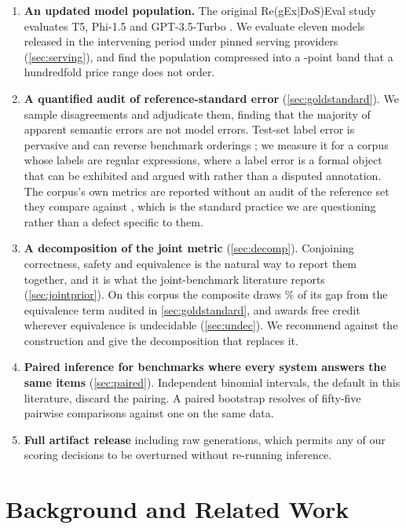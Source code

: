 \documentclass[11pt]{article}
\begin{document}
\begin{enumerate}
  \item \textbf{An updated model population.}
  The original Re(gEx$|$DoS)Eval study evaluates T5, Phi-1.5 and
  GPT-3.5-Turbo \citep{siddiq2024regexeval}. We
  evaluate eleven models released in the intervening period under pinned
  serving providers (\cref{sec:serving}), and find the population compressed
  into a \bandwidth{}-point band that a hundredfold price range does not
  order.

  \item \textbf{A quantified audit of reference-standard error}
  (\cref{sec:goldstandard}). We sample disagreements and adjudicate them,
  finding that the majority of apparent semantic errors are not model errors.
  Test-set label error is pervasive and can reverse benchmark orderings
  \citep{northcutt2021labelerrors}; we measure it for a corpus
  whose labels are regular expressions, where a label error is a formal
  object that can be exhibited and argued with rather than a disputed
  annotation. The corpus's own metrics are reported without an audit of the
  reference set they compare against \citep{siddiq2024regexeval}, which is the standard
  practice we are questioning rather than a defect specific to them.

  \item \textbf{A decomposition of the joint metric} (\cref{sec:decomp}).
  Conjoining correctness, safety and equivalence is the natural way to report
  them together, and it is what the joint-benchmark literature reports
  (\cref{sec:jointprior}). On this corpus the composite draws \equivshare{}\%
  of its gap from the equivalence term audited in \cref{sec:goldstandard}, and awards free
  credit wherever equivalence is undecidable (\cref{sec:undec}). We recommend
  against the construction and give the decomposition that replaces it.

  \item \textbf{Paired inference for benchmarks where every system answers
  the same items} (\cref{sec:paired}). Independent binomial intervals, the
  default in this literature, discard the pairing. A paired bootstrap
  resolves \resolvedusable{} of fifty-five pairwise comparisons against one
  on the same data.

  \item \textbf{Full artifact release} including raw generations, which
  permits any of our scoring decisions to be overturned without re-running
  inference.
\end{enumerate}

\section{Background and Related Work}
\end{document}
